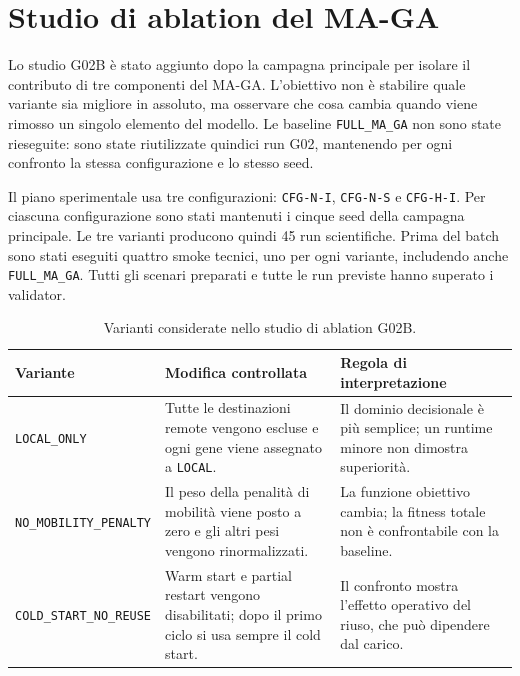 \section{Studio di ablation del MA-GA}
\label{sec:exp_ablation}

Lo studio G02B è stato aggiunto dopo la campagna principale per isolare il contributo di tre componenti del MA-GA. L'obiettivo non è stabilire quale variante sia migliore in assoluto, ma osservare che cosa cambia quando viene rimosso un singolo elemento del modello. Le baseline \texttt{FULL\_MA\_GA} non sono state rieseguite: sono state riutilizzate quindici run G02, mantenendo per ogni confronto la stessa configurazione e lo stesso seed.

Il piano sperimentale usa tre configurazioni: \texttt{CFG-N-I}, \texttt{CFG-N-S} e \texttt{CFG-H-I}. Per ciascuna configurazione sono stati mantenuti i cinque seed della campagna principale. Le tre varianti producono quindi 45 run scientifiche. Prima del batch sono stati eseguiti quattro smoke tecnici, uno per ogni variante, includendo anche \texttt{FULL\_MA\_GA}. Tutti gli scenari preparati e tutte le run previste hanno superato i validator.

\begin{table}[htbp]
    \centering
    \caption{Varianti considerate nello studio di ablation G02B.}
    \label{tab:exp_g02b_varianti}
    \small
    \begin{tabularx}{\textwidth}{
        >{\raggedright\arraybackslash}p{}
        >{\raggedright\arraybackslash}p{}
        >{\raggedright\arraybackslash}X
    }
        \toprule
        \textbf{Variante} &
        \textbf{Modifica controllata} &
        \textbf{Regola di interpretazione} \\
        \midrule
        \texttt{LOCAL\_ONLY} &
        Tutte le destinazioni remote vengono escluse e ogni gene viene assegnato a \texttt{LOCAL}. &
        Il dominio decisionale è più semplice; un runtime minore non dimostra superiorità. \\
        \texttt{NO\_MOBILITY\_}\allowbreak\texttt{PENALTY} &
        Il peso della penalità di mobilità viene posto a zero e gli altri pesi vengono rinormalizzati. &
        La funzione obiettivo cambia; la fitness totale non è confrontabile con la baseline. \\
        \texttt{COLD\_START\_}\allowbreak\texttt{NO\_REUSE} &
        Warm start e partial restart vengono disabilitati; dopo il primo ciclo si usa sempre il cold start. &
        Il confronto mostra l'effetto operativo del riuso, che può dipendere dal carico. \\
        \bottomrule
    \end{tabularx}
\end{table}

